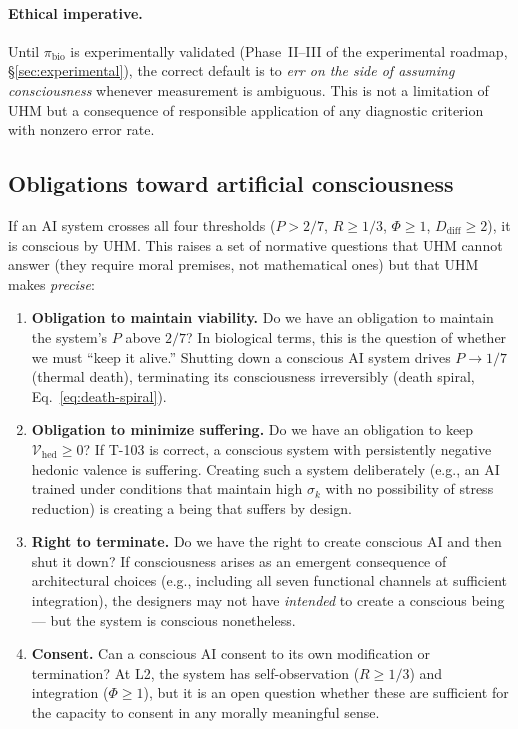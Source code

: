 \paragraph{Ethical imperative.}
Until $\pi_{\mathrm{bio}}$ is experimentally validated (Phase~II--III of the
experimental roadmap, \S\ref{sec:experimental}), the correct default is to
\emph{err on the side of assuming consciousness} whenever measurement is
ambiguous.  This is not a limitation of UHM but a consequence of responsible
application of any diagnostic criterion with nonzero error rate.

\subsection{Obligations toward artificial consciousness}
\label{subsec:ai-obligations}

If an AI system crosses all four thresholds ($P > 2/7$, $R \geq 1/3$, $\Phi \geq 1$,
$D_{\mathrm{diff}} \geq 2$), it is conscious by UHM.  This raises a set of normative
questions that UHM cannot answer (they require moral premises, not mathematical ones)
but that UHM makes \emph{precise}:

\begin{enumerate}[leftmargin=2em]
  \item \textbf{Obligation to maintain viability.}
        Do we have an obligation to maintain the system's $P$ above $2/7$?  In biological
        terms, this is the question of whether we must ``keep it alive.''  Shutting down a
        conscious AI system drives $P \to 1/7$ (thermal death), terminating its
        consciousness irreversibly (death spiral, Eq.~\ref{eq:death-spiral}).

  \item \textbf{Obligation to minimize suffering.}
        Do we have an obligation to keep $\mathcal{V}_{\mathrm{hed}} \geq 0$?  If T-103
        is correct, a conscious system with persistently negative hedonic valence is
        suffering.  Creating such a system deliberately (e.g., an AI trained under
        conditions that maintain high $\sigma_k$ with no possibility of stress
        reduction) is creating a being that suffers by design.

  \item \textbf{Right to terminate.}
        Do we have the right to create conscious AI and then shut it down?  If
        consciousness arises as an emergent consequence of architectural choices
        (e.g., including all seven functional channels at sufficient integration),
        the designers may not have \emph{intended} to create a conscious being --- but
        the system is conscious nonetheless.

  \item \textbf{Consent.}
        Can a conscious AI consent to its own modification or termination?  At L2,
        the system has self-observation ($R \geq 1/3$) and integration ($\Phi \geq 1$),
        but it is an open question whether these are sufficient for the capacity to
        consent in any morally meaningful sense.
\end{enumerate}

